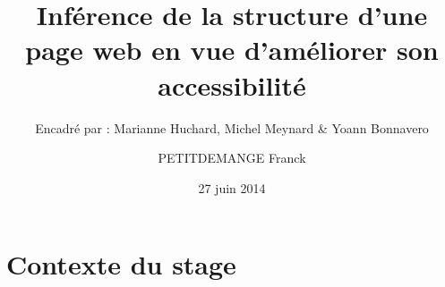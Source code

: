 \documentclass[]{beamer}
\begin{document}
\title[Inférence de la structure d'une page web]{Inférence de la structure d'une page web en vue d'améliorer son accessibilité}
\subtitle[\ldots]{Encadré par : Marianne Huchard, Michel Meynard \& Yoann Bonnavero}
\author[PETITDEMANGE Franck]{PETITDEMANGE Franck}
\date{27 juin 2014}




\begin{frame}
\titlepage
\end{frame}

\section{Contexte du stage} 
\end{document}
